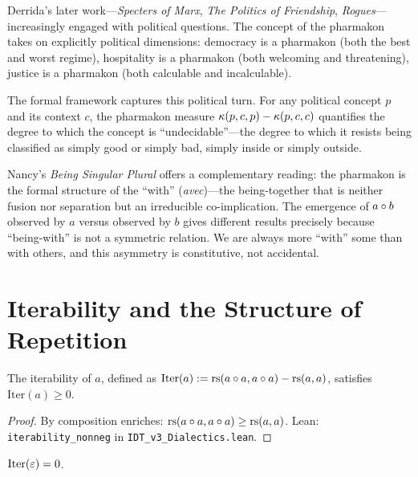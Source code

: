 \begin{interpretation}
Derrida's later work---\textit{Specters of Marx}, \textit{The Politics of
Friendship}, \textit{Rogues}---increasingly engaged with political questions.
The concept of the pharmakon takes on explicitly political dimensions:
democracy is a pharmakon (both the best and worst regime), hospitality is
a pharmakon (both welcoming and threatening), justice is a pharmakon (both
calculable and incalculable).

The formal framework captures this political turn. For any political concept
$p$ and its context $c$, the pharmakon measure
$\kappa(p, c, p) - \kappa(p, c, c)$ quantifies the degree to which the
concept is ``undecidable''---the degree to which it resists being classified
as simply good or simply bad, simply inside or simply outside.

Nancy's \textit{Being Singular Plural} offers a complementary reading: the
pharmakon is the formal structure of the ``with'' (\textit{avec})---the
being-together that is neither fusion nor separation but an irreducible
co-implication. The emergence of $a \circ b$ observed by $a$ versus
observed by $b$ gives different results precisely because ``being-with'' is
not a symmetric relation. We are always more ``with'' some than with others,
and this asymmetry is constitutive, not accidental.
\end{interpretation}

\section{Iterability and the Structure of Repetition}

\begin{theorem}
\label{thm:iterability-nonneg}
The iterability of $a$, defined as $\mathrm{Iter}(a) := \mathrm{rs}(a \circ a,
a \circ a) - \mathrm{rs}(a, a)$, satisfies $\mathrm{Iter}(a) \geq 0$.
\end{theorem}

\begin{proof}
By composition enriches: $\mathrm{rs}(a \circ a, a \circ a) \geq \mathrm{rs}(a, a)$.
Lean: \texttt{iterability\_nonneg} in \texttt{IDT\_v3\_Dialectics.lean}.
\end{proof}

\begin{theorem}
\label{thm:iterability-void-formal}
$\mathrm{Iter}(\varepsilon) = 0$.
\end{theorem}

